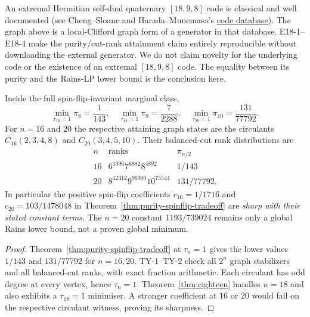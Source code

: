 \begin{remark}
An extremal Hermitian self-dual quaternary
$[18,9,8]$ code is classical and well documented
(see Cheng--Sloane and Harada--Munemasa's
\href{https://www.math.is.tohoku.ac.jp/~mharada/research/codes/hsd4.htm}
{code database}).
The graph above is a local-Clifford graph form of a
generator in that database. E18-1--E18-4 make the
purity/cut-rank attainment claim entirely reproducible
without downloading the external generator.
We do not claim novelty for the underlying code or
the existence of an extremal $[18,9,8]$ code.
The equality between its purity and the Rains-LP
lower bound is the conclusion here.
\end{remark}

\begin{corollary}\label{cor:typeII-sixteen-twenty}
Inside the full spin-flip-invariant marginal class,
\[
 \boxed{\quad
 \min_{\tau_{16}=1}\pi_8=\frac1{143},\quad
 \min_{\tau_{18}=1}\pi_9=\frac7{2288},\quad
 \min_{\tau_{20}=1}\pi_{10}=\frac{131}{77792}.
 \quad}
\]
For $n=16$ and $20$ the respective attaining graph
states are the circulants $C_{16}(2,3,4,8)$ and
$C_{20}(3,4,5,10)$. Their balanced-cut rank
distributions are
\[
\begin{array}{c|l|c}
n & \text{ranks} & \pi_{n/2}\\\hline
16&6^{1096}7^{6882}8^{4892}&1/143\\
20&8^{12312}9^{96900}10^{75544}&131/77792.
\end{array}
\]
In particular the positive spin-flip coefficients
$c_{16}=1/1716$ and $c_{20}=103/1478048$
in Theorem~\ref{thm:purity-spinflip-tradeoff} are
\emph{sharp with their stated constant terms}.
The $n=20$ constant $1193/739024$ remains only a
global Rains lower bound, not a proven global minimum.
\end{corollary}
\begin{proof}
Theorem~\ref{thm:purity-spinflip-tradeoff} at
$\tau_n=1$ gives the lower values $1/143$
and $131/77792$ for $n=16,20$. TY-1--TY-2
check all $2^n$ graph stabilizers and all
balanced-cut ranks, with exact fraction arithmetic.
Each circulant has odd degree at every vertex, hence
$\tau_n=1$. Theorem~\ref{thm:eighteen} handles
$n=18$ and also exhibits a $\tau_{18}=1$ minimiser.
A stronger coefficient at $16$ or $20$ would fail
on the respective circulant witness, proving its
sharpness.
\end{proof}
